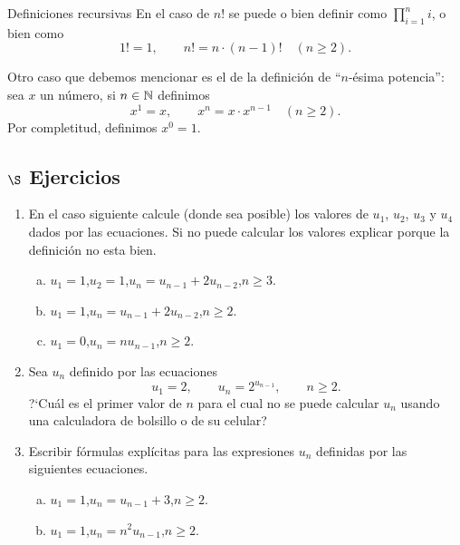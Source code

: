 \begin{section}{Definiciones recursivas}
En  el caso de $n!$ se puede  o bien definir como $\prod_{i=1}^{n} i$, o bien como
$$
1!=1,\qquad n!=n \cdot (n-1)! \quad (n\ge 2).
$$

Otro caso que debemos mencionar es  el de la definición de ``$n$-ésima potencia'': sea $x$ un  número, si $n \in {\mathbb N}$ definimos
$$
x^1=x,\qquad x^n= x \cdot x^{n-1} \quad (n\ge 2).
$$
Por completitud,  definimos $x^0=1$. 


\subsection*{\Large $\S$ Ejercicios}
\begin{enumerate}[1)]
\item En el caso siguiente calcule (donde sea posible) los
valores de $u_1$, $u_2$, $u_3$ y $u_4$ dados por las ecuaciones.
Si no puede calcular los valores explicar porque la definición no
esta bien.
\begin{enumerate}[a)]
\item $u_1 = 1$,\qquad $u_2=1$,\qquad $u_n = u_{n-1} +2 u_{n-2}$,\qquad $n \ge 3$. 
\item $u_1 = 1$,\qquad $u_n = u_{n-1} +2u_{n-2}$,\qquad $n \ge 2$. 
\item $u_1 = 0$,\qquad $u_n = nu_{n-1}$,\qquad $n \ge 2$.
\end{enumerate}
\item Sea $u_n$ definido por las ecuaciones
$$
u_1=2,\qquad u_n= 2^{u_{n-1}}, \qquad n\ge 2.
$$
?`Cuál es el primer valor de $n$ para el cual no se puede calcular
$u_n$ usando una calculadora de bolsillo o de su celular?
\item Escribir fórmulas explícitas para las expresiones $u_n$
definidas por las siguientes ecuaciones.
\begin{enumerate}[a)]
\item $u_1 = 1$,\qquad $u_n = u_{n-1} +3$,\qquad $n \ge 2$. 
\item $u_1 = 1$,\qquad $u_n = n^2u_{n-1}$,\qquad $n \ge 2$.
\end{enumerate}
\end{enumerate}
\end{section}


